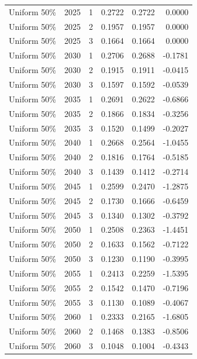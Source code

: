 \begin{longtable}{lrrrrr}
Uniform 50\% & 2025 & 1 & 0.2722 & 0.2722 & 0.0000 \\
Uniform 50\% & 2025 & 2 & 0.1957 & 0.1957 & 0.0000 \\
Uniform 50\% & 2025 & 3 & 0.1664 & 0.1664 & 0.0000 \\
Uniform 50\% & 2030 & 1 & 0.2706 & 0.2688 & -0.1781 \\
Uniform 50\% & 2030 & 2 & 0.1915 & 0.1911 & -0.0415 \\
Uniform 50\% & 2030 & 3 & 0.1597 & 0.1592 & -0.0539 \\
Uniform 50\% & 2035 & 1 & 0.2691 & 0.2622 & -0.6866 \\
Uniform 50\% & 2035 & 2 & 0.1866 & 0.1834 & -0.3256 \\
Uniform 50\% & 2035 & 3 & 0.1520 & 0.1499 & -0.2027 \\
Uniform 50\% & 2040 & 1 & 0.2668 & 0.2564 & -1.0455 \\
Uniform 50\% & 2040 & 2 & 0.1816 & 0.1764 & -0.5185 \\
Uniform 50\% & 2040 & 3 & 0.1439 & 0.1412 & -0.2714 \\
Uniform 50\% & 2045 & 1 & 0.2599 & 0.2470 & -1.2875 \\
Uniform 50\% & 2045 & 2 & 0.1730 & 0.1666 & -0.6459 \\
Uniform 50\% & 2045 & 3 & 0.1340 & 0.1302 & -0.3792 \\
Uniform 50\% & 2050 & 1 & 0.2508 & 0.2363 & -1.4451 \\
Uniform 50\% & 2050 & 2 & 0.1633 & 0.1562 & -0.7122 \\
Uniform 50\% & 2050 & 3 & 0.1230 & 0.1190 & -0.3995 \\
Uniform 50\% & 2055 & 1 & 0.2413 & 0.2259 & -1.5395 \\
Uniform 50\% & 2055 & 2 & 0.1542 & 0.1470 & -0.7196 \\
Uniform 50\% & 2055 & 3 & 0.1130 & 0.1089 & -0.4067 \\
Uniform 50\% & 2060 & 1 & 0.2333 & 0.2165 & -1.6805 \\
Uniform 50\% & 2060 & 2 & 0.1468 & 0.1383 & -0.8506 \\
Uniform 50\% & 2060 & 3 & 0.1048 & 0.1004 & -0.4343 \\
\end{longtable}
\normalsize
